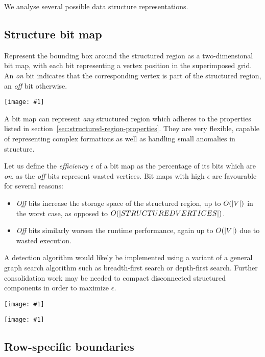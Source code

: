 We analyse several possible data structure representations.

\subsection{Structure bit map}

\newcommand{\drawbitmap}[1]{
	\texttt{[image: \#1]}
}

Represent the bounding box around the structured region as a two-dimensional bit map, with each bit representing a vertex position in the superimposed grid. An \emph{on} bit indicates that the corresponding vertex is part of the structured region, an \emph{off} bit otherwise.

\drawbitmap{images/bitmap-representation/plain-bitmap.pdf}

A bit map can represent \emph{any} structured region which adheres to the properties listed in section~\ref{sec:structured-region-properties}. They are very flexible, capable of representing complex formations as well as handling small anomalies in structure.

Let us define the \emph{efficiency} $\epsilon$ of a bit map as the percentage of its bits which are \emph{on}, as the \emph{off} bits represent wasted vertices. Bit maps with high $\epsilon$ are favourable for several reasons:
\begin{itemize}
\item \emph{Off} bits increase the storage space of the structured region, up to $O(\left\vert{V}\right\vert)$ in the worst case, as opposed to $O(\left\vert{STRUCTURED VERTICES}\right\vert)$.
\item \emph{Off} bits similarly worsen the runtime performance, again up to $O(\left\vert{V}\right\vert)$ due to wasted execution.
\end{itemize}

A detection algorithm would likely be implemented using a variant of a general graph search algorithm such as breadth-first search or depth-first search. Further consolidation work may be needed to compact disconnected structured components in order to maximize $\epsilon$.
\drawbitmap{images/bitmap-representation/disjoint-bitmap.pdf}
\drawbitmap{images/bitmap-representation/disjoint2-bitmap.pdf}



\subsection{Row-specific boundaries}

